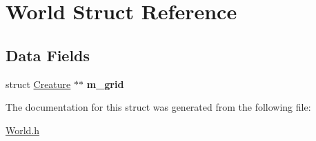 \hypertarget{structWorld}{\section{\-World \-Struct \-Reference}
\label{structWorld}
}
\subsection*{\-Data \-Fields}
\begin{DoxyCompactItemize}
\item 
\hypertarget{structWorld_a5f294430ea69583eed379f4d64fc1f55}{struct \hyperlink{structCreature}{\-Creature} $\ast$$\ast$ {\bfseries m\-\_\-grid}}\label{structWorld_a5f294430ea69583eed379f4d64fc1f55}

\end{DoxyCompactItemize}


\-The documentation for this struct was generated from the following file\-:\begin{DoxyCompactItemize}
\item 
\hyperlink{World_8h}{\-World.\-h}\end{DoxyCompactItemize}
